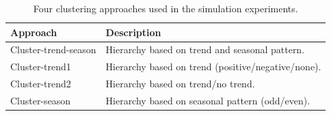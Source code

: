 \documentclass[a4paper,review,12pt,authoryear]{elsarticle}
\begin{document}








\begin{table}[h!]
    \centering
    \caption{\label{tab:simu_methods}Four clustering approaches used in the simulation experiments.}
    \begin{tabular}{ll}\toprule
        Approach & Description \\ \midrule
        Cluster-trend-season & Hierarchy based on trend and seasonal pattern. \\
        Cluster-trend1 &  Hierarchy based on trend (positive/negative/none). \\
        Cluster-trend2 & Hierarchy based on trend/no trend. \\
        Cluster-season & Hierarchy based on seasonal pattern (odd/even). \\\bottomrule
    \end{tabular}
    \label{tab:7}
\end{table}
\end{document}
